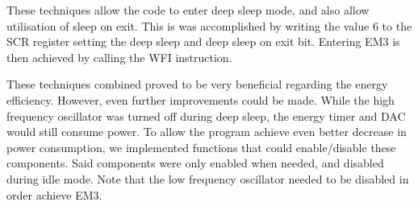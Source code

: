 These techniques allow the code to enter deep sleep mode, and also allow utilisation of sleep on exit. This is was accomplished by writing the value 6 to the SCR register setting the deep sleep and deep sleep on exit bit. Entering EM3 is then achieved by calling the WFI instruction.

These techniques combined proved to be very beneficial regarding the energy efficiency. However, even further improvements could be made. While the high frequency oscillator was turned off during deep sleep, the energy timer and DAC would still consume power. To allow the program achieve even better decrease in power consumption, we implemented functions that could enable/disable these components. Said components were only enabled when needed, and disabled during idle mode. Note that the low frequency oscillator needed to be disabled in order achieve EM3. 